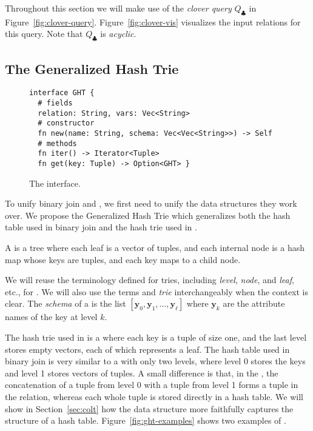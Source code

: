 Throughout this section we will make use of the {\em clover query}
$Q_\clubsuit$ in Figure~\ref{fig:clover-query}.
Figure~\ref{fig:clover-vis} visualizes the input relations for this query.
Note that $Q_\clubsuit$ is
\emph{acyclic}.

\subsection{The Generalized Hash Trie}\label{sec:ght}

\begin{figure}
\begin{lstlisting}
interface GHT {
  # fields
  relation: String, vars: Vec<String>  
  # constructor
  fn new(name: String, schema: Vec<Vec<String>>) -> Self
  # methods
  fn iter() -> Iterator<Tuple>
  fn get(key: Tuple) -> Option<GHT> }
\end{lstlisting}
\caption{The \GHT interface.}
\label{fig:ght}
\end{figure}

To unify binary join and \GJ, 
  we first need to unify the data structures they work over.
We propose the Generalized Hash Trie 
  which generalizes both the hash table used in binary join 
  and the hash trie used in \GJ.

\begin{definition}
  A \GHT is a tree where each leaf is a vector of tuples, and
  each internal node is a hash map whose keys are tuples, and each key
  maps to a child node.
\end{definition}

We will reuse the terminology defined for tries, including
\emph{level}, \emph{node}, and \emph{leaf}, etc., for \GHTs.  We will
also use the terms \GHT and \emph{trie} interchangeably when the
context is clear.  The {\em schema} of a \GHT is the list
$[\bm y_0,\bm y_1, \ldots, \bm y_\ell]$ where $\bm y_k$ are the
attribute names of the key at level $k$. 

The hash trie used in \GJ is a \GHT where each key is a tuple of size one,
  and the last level stores empty vectors, each of which represents a leaf.
The hash table used in binary join is very similar to a \GHT with only two levels,
  where level 0 stores the keys and level 1 stores
  vectors of tuples.
A small difference is that, in the \GHT, the concatenation of 
  a tuple from level 0 with a tuple from level 1 forms a tuple in the relation, 
  whereas each whole tuple is stored directly in a hash table.
We will show in Section~\ref{sec:colt} how the \COLT data structure
  more faithfully captures the structure of a hash table.
Figure~\ref{fig:ght-examples} shows two examples of \GHTs.

